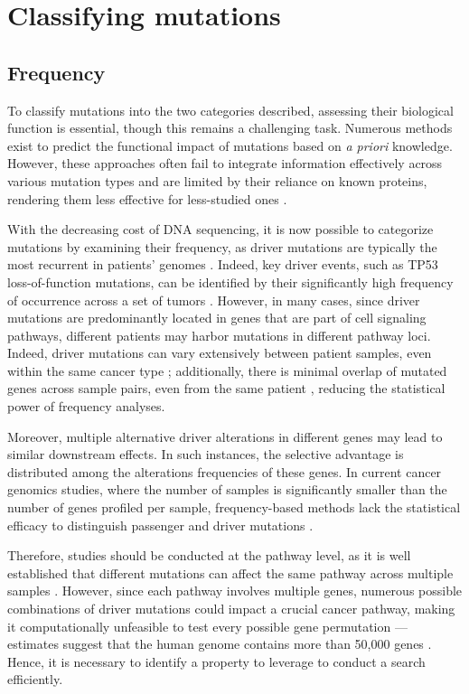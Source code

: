 \section{Classifying mutations}

\subsection{Frequency}

To classify mutations into the two categories described, assessing their biological function is essential, though this remains a challenging task. Numerous methods exist to predict the functional impact of mutations based on \textit{a priori} knowledge. However, these approaches often fail to integrate information effectively across various mutation types and are limited by their reliance on known proteins, rendering them less effective for less-studied ones \cite{multi-dendrix}.

With the decreasing cost of DNA sequencing, it is now possible to categorize mutations by examining their frequency, as driver mutations are typically the most recurrent in patients' genomes \cite{multi-dendrix}. Indeed, key driver events, such as TP53 loss-of-function mutations, can be identified by their significantly high frequency of occurrence across a set of tumors \cite{mutex}. However, in many cases, since driver mutations are predominantly located in genes that are part of cell signaling pathways, different patients may harbor mutations in different pathway loci. Indeed, driver mutations can vary extensively between patient samples, even within the same cancer type \cite{multi-dendrix}; additionally, there is minimal overlap of mutated genes across sample pairs, even from the same patient \cite{mdpfinder}, reducing the statistical power of frequency analyses.

Moreover, multiple alternative driver alterations in different genes may lead to similar downstream effects. In such instances, the selective advantage is distributed among the alterations frequencies of these genes. In current cancer genomics studies, where the number of samples is significantly smaller than the number of genes profiled per sample, frequency-based methods lack the statistical efficacy to distinguish passenger and driver mutations \cite{mutex}. 

Therefore, studies should be conducted at the pathway level, as it is well established that different mutations can affect the same pathway across multiple samples \cite{multi-dendrix}. However, since each pathway involves multiple genes, numerous possible combinations of driver mutations could impact a crucial cancer pathway, making it computationally unfeasible to test every possible gene permutation \cite{dendrix} --- estimates suggest that the human genome contains more than 50,000 genes \cite{n-genes}. Hence, it is necessary to identify a property to leverage to conduct a search efficiently.

